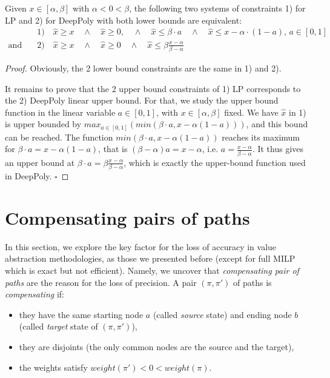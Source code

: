 \documentclass{llncs}
\begin{document}
\begin{proposition}
	\label{LP}
	Given $x \in [\alpha,\beta]$ with $\alpha < 0 < \beta$, the following two systems of constraints 
	1) for LP and 2) for DeepPoly with both lower bounds are equivalent:
	\vspace{-0.3cm}
	\begin{align*}
		& 1) \quad \hat{x} \geq x \quad \wedge \quad \hat{x} \geq 0, \quad \wedge \quad \hat{x} \leq \beta \cdot a \quad \wedge \quad \hat{x} \leq x-\alpha \cdot (1-a), \, a \in [0,1] \\
		\text{and} \quad  & 2)  \quad \hat{x} \geq x \quad \wedge \quad \hat{x} \geq 0 \quad \wedge \quad \hat{x} \leq \beta \frac{x-\alpha}{\beta-\alpha}
	\end{align*} 
\end{proposition}

\begin{proof}
	Obviously, the 2 lower bound constraints are the same in 1) and 2).
	
	It remains to prove that the 2 upper bound constraints of 1) LP corresponds to the 2) DeepPoly linear upper bound. For that, we study the upper bound function in the linear variable $a \in  [0,1]$, with $x \in [\alpha,\beta]$ fixed. We have $\hat{x}$ in 1) is upper bounded by $max_{a \in [0,1]} (min(\beta \cdot a, x - \alpha (1-a)))$, and this bound can be reached. 
	The function $min(\beta \cdot a, x - \alpha (1-a))$ reaches its maximum for 
	$\beta \cdot a = x - \alpha (1-a)$, that is 
	$(\beta - \alpha) a = x - \alpha$, i.e. 
	$ a = \frac{x - \alpha}{\beta-\alpha}$.
	It thus gives an upper bound at 
	$\beta \cdot a = \beta \frac{x - \alpha}{\beta-\alpha}$, which is exactly the upper-bound function used in DeepPoly.
	\hfill $\square$
\end{proof}







\section{Compensating pairs of paths}
\label{Sec.comp}

In this section, we explore the key factor for the loss of accuracy in value abstraction methodologies, as those we presented before (except for full MILP which is exact but 
not efficient). 
Namely, we uncover that \emph{compensating pair of paths} are the reason for the loss of precision. A pair $(\pi,\pi')$ of paths is {\em compensating} if:
\begin{itemize}
	\item they have the same starting node $a$ (called {\em source} state) and ending node $b$ (called {\em target} state of $(\pi,\pi')$),
	\item they are disjoints (the only common nodes are the source and the target),
	\item the weights satisfy $weight(\pi') < 0 < weight(\pi)$.
\end{itemize}
\end{document}
